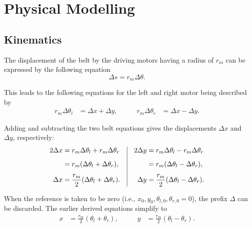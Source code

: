 \documentclass[a4paper,11pt]{article}
\begin{document}
\section{Physical Modelling}

\subsection{Kinematics}

The displacement of the belt by the driving motors having a radius of $r_m$ can be expressed by the following equation
\begin{equation}
    \Delta s = r_m \Delta \theta.
\end{equation}

This leads to the following equations for the left and right motor being described by 
\begin{equation}
\begin{aligned}
    r_m \Delta \theta_l &= \Delta x + \Delta y,
    &\qquad
    r_m \Delta \theta_r &= \Delta x - \Delta y.
\end{aligned}
\end{equation}

Adding and subtracting the two belt equations gives the
displacements $\Delta x$ and $\Delta y$, respectively:
\begin{equation}
\begin{array}{@{}c@{\quad}|@{\quad}c@{}}
    \begin{aligned}
        2\Delta x
        &= r_m\Delta\theta_l+r_m\Delta\theta_r \\[0.5em]
        &= r_m(\Delta\theta_l+\Delta\theta_r), \\[0.5em]
        \Delta x
        &= \frac{r_m}{2}
           (\Delta\theta_l+\Delta\theta_r).
    \end{aligned}
    &
    \begin{aligned}
        2\Delta y
        &= r_m\Delta\theta_l-r_m\Delta\theta_r \\[0.5em]
        &= r_m(\Delta\theta_l-\Delta\theta_r), \\[0.5em]
        \Delta y
        &= \frac{r_m}{2}
           (\Delta\theta_l-\Delta\theta_r).
    \end{aligned}
\end{array}
\end{equation}

When the reference is taken to be zero (i.e., $x_0,y_0,\theta_{l,0},\theta_{r,0}=0$), the prefix $\Delta$ can be discarded. The earlier derived equations simplify to
\begin{equation}
\begin{aligned}
    x &= \frac{r_m}{2} \left(\theta_l + \theta_r \right),
    &\qquad
    y &= \frac{r_m}{2} \left(\theta_l - \theta_r \right).
\end{aligned}
\end{equation}
\end{document}
